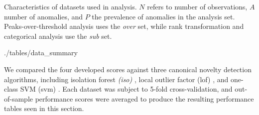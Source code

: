 \begin{table}[t]
    \centering
    \caption{Characteristics of datasets used in analysis.  $N$ refers to number of 
    observations, $A$ number of anomalies, and $P$ the prevalence of anomalies in the
    analysis set.    Peaks-over-threshold analysis uses the \emph{over} set, while rank
    transformation and categorical analysis use the \emph{sub} set.\label{tab:data}}
    \bigskip
     {./tables/data_summary}
\end{table}

We compared the four developed scores against three canonical novelty detection algorithms,
    including isolation forest \emph{(iso)} \cite{liu2000}, local outlier factor (lof)
    \cite{breunig2000},
    and one-class SVM (svm) \cite{chang2011}.  Each dataset was subject to 5-fold 
    cross-validation, and out-of-sample performance scores were averaged to produce the
    resulting performance tables seen in this section.

